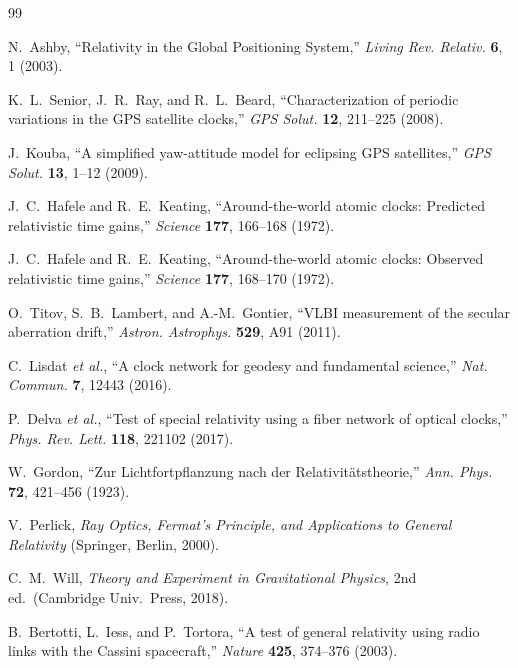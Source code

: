 \documentclass[12pt,a4paper,twocolumn]{article}
\begin{document}
\begin{thebibliography}{99}

N.~Ashby, ``Relativity in the Global Positioning System,''
\textit{Living Rev. Relativ.} \textbf{6}, 1 (2003).

K.~L.~Senior, J.~R.~Ray, and R.~L.~Beard, ``Characterization of
periodic variations in the GPS satellite clocks,''
\textit{GPS Solut.} \textbf{12}, 211--225 (2008).

J.~Kouba, ``A simplified yaw-attitude model for eclipsing GPS
satellites,'' \textit{GPS Solut.} \textbf{13}, 1--12 (2009).

J.~C.~Hafele and R.~E.~Keating, ``Around-the-world atomic clocks:
Predicted relativistic time gains,''
\textit{Science} \textbf{177}, 166--168 (1972).

J.~C.~Hafele and R.~E.~Keating, ``Around-the-world atomic clocks:
Observed relativistic time gains,''
\textit{Science} \textbf{177}, 168--170 (1972).

O.~Titov, S.~B.~Lambert, and A.-M.~Gontier, ``VLBI measurement
of the secular aberration drift,''
\textit{Astron. Astrophys.} \textbf{529}, A91 (2011).

C.~Lisdat \textit{et al.}, ``A clock network for geodesy and
fundamental science,''
\textit{Nat. Commun.} \textbf{7}, 12443 (2016).

P.~Delva \textit{et al.}, ``Test of special relativity using a
fiber network of optical clocks,''
\textit{Phys. Rev. Lett.} \textbf{118}, 221102 (2017).

W.~Gordon, ``Zur Lichtfortpflanzung nach der Relativit\"atstheorie,''
\textit{Ann. Phys.} \textbf{72}, 421--456 (1923).

V.~Perlick, \textit{Ray Optics, Fermat's Principle, and
Applications to General Relativity} (Springer, Berlin, 2000).

C.~M.~Will, \textit{Theory and Experiment in Gravitational Physics},
2nd ed.\ (Cambridge Univ.\ Press, 2018).

B.~Bertotti, L.~Iess, and P.~Tortora, ``A test of general
relativity using radio links with the Cassini spacecraft,''
\textit{Nature} \textbf{425}, 374--376 (2003).


\end{thebibliography}
\end{document}
